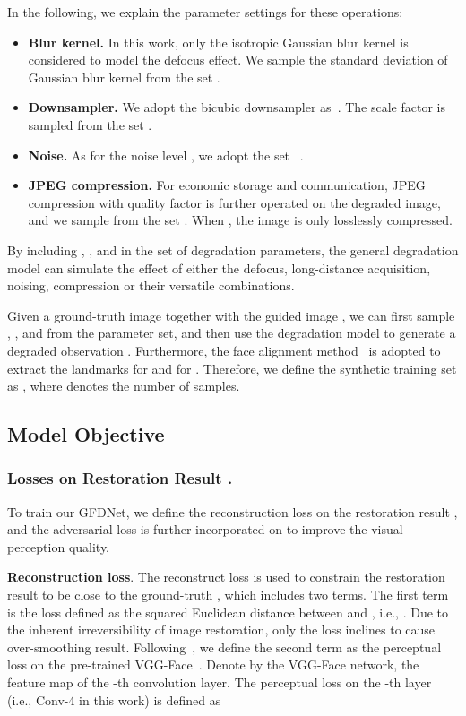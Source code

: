 \documentclass[runningheads]{llncs}
\begin{document}
In the following, we explain the parameter settings for these operations:
\begin{itemize}
 \item \textbf{Blur kernel.} In this work, only the isotropic Gaussian blur kernel  is considered to model the defocus effect.
We sample the standard deviation of Gaussian blur kernel from the set .
 \item \textbf{Downsampler.} We adopt the bicubic downsampler as~\cite{zhu2016deep,cao2017attention,chen2017fsrnet,huang2017wavelet,xu2017learning}. The scale factor  is sampled from the set .
\item \textbf{Noise.} As for the noise level , we adopt the set ~\cite{xu2017learning}.
\item \textbf{JPEG compression.} For economic storage and communication, JPEG compression with quality factor  is further operated on the degraded image, and we sample  from the set . When , the image is only losslessly compressed.
\end{itemize}
By including , ,  and  in the set of degradation parameters, the general degradation model can simulate the effect of either the defocus, long-distance acquisition, noising, compression or their versatile combinations.


Given a ground-truth image  together with the guided image , we can first sample , ,  and  from the parameter set, and then use the degradation model to generate a degraded observation .
Furthermore, the face alignment method~\cite{TCDCN} is adopted to extract the landmarks  for  and  for .
Therefore, we define the synthetic training set as , where  denotes the number of samples.

\subsection{Model Objective}
\subsubsection{Losses on Restoration Result .}
To train our GFDNet, we define the reconstruction loss on the restoration result , and the adversarial loss is further incorporated on  to improve the visual perception quality.

\textbf{Reconstruction loss}.
The reconstruct loss is used to constrain the restoration result  to be close to the ground-truth , which includes two terms.
The first term is the  loss defined as the squared Euclidean distance between  and , i.e., .
Due to the inherent irreversibility of image restoration, only the  loss inclines to cause over-smoothing result.
Following~\cite{johnson2016perceptual}, we define the second term as the perceptual loss on the pre-trained VGG-Face~\cite{parkhi2015deep}.
Denote by  the VGG-Face network,  the feature map of the -th convolution layer.
The perceptual loss on the -th layer (i.e., Conv-4 in this work) is defined as
\end{document}
